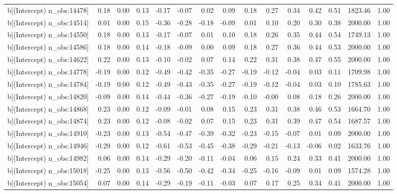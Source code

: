 \begin{table}[ht]
\begin{tabular}{rrrrrrrrrrrrrrr}
  b[(Intercept) n\_obs:14478] & 0.18 & 0.00 & 0.13 & -0.17 & -0.07 & 0.02 & 0.09 & 0.18 & 0.27 & 0.34 & 0.42 & 0.51 & 1823.46 & 1.00 \\ 
  b[(Intercept) n\_obs:14514] & 0.01 & 0.00 & 0.15 & -0.36 & -0.28 & -0.18 & -0.09 & 0.01 & 0.10 & 0.20 & 0.30 & 0.38 & 2000.00 & 1.00 \\ 
  b[(Intercept) n\_obs:14550] & 0.18 & 0.00 & 0.13 & -0.17 & -0.07 & 0.01 & 0.10 & 0.18 & 0.26 & 0.35 & 0.44 & 0.54 & 1749.13 & 1.00 \\ 
  b[(Intercept) n\_obs:14586] & 0.18 & 0.00 & 0.14 & -0.18 & -0.09 & 0.00 & 0.09 & 0.18 & 0.27 & 0.36 & 0.44 & 0.53 & 2000.00 & 1.00 \\ 
  b[(Intercept) n\_obs:14622] & 0.22 & 0.00 & 0.13 & -0.10 & -0.02 & 0.07 & 0.14 & 0.22 & 0.31 & 0.38 & 0.47 & 0.55 & 2000.00 & 1.00 \\ 
  b[(Intercept) n\_obs:14778] & -0.19 & 0.00 & 0.12 & -0.49 & -0.42 & -0.35 & -0.27 & -0.19 & -0.12 & -0.04 & 0.03 & 0.11 & 1709.98 & 1.00 \\ 
  b[(Intercept) n\_obs:14784] & -0.19 & 0.00 & 0.12 & -0.49 & -0.43 & -0.35 & -0.27 & -0.19 & -0.12 & -0.04 & 0.03 & 0.10 & 1785.63 & 1.00 \\ 
  b[(Intercept) n\_obs:14820] & -0.09 & 0.00 & 0.14 & -0.44 & -0.36 & -0.27 & -0.19 & -0.10 & -0.00 & 0.08 & 0.18 & 0.26 & 2000.00 & 1.00 \\ 
  b[(Intercept) n\_obs:14868] & 0.23 & 0.00 & 0.12 & -0.09 & -0.01 & 0.08 & 0.15 & 0.23 & 0.31 & 0.38 & 0.46 & 0.53 & 1664.70 & 1.00 \\ 
  b[(Intercept) n\_obs:14874] & 0.23 & 0.00 & 0.12 & -0.08 & -0.02 & 0.07 & 0.15 & 0.23 & 0.31 & 0.39 & 0.47 & 0.54 & 1687.57 & 1.00 \\ 
  b[(Intercept) n\_obs:14910] & -0.23 & 0.00 & 0.13 & -0.54 & -0.47 & -0.39 & -0.32 & -0.23 & -0.15 & -0.07 & 0.01 & 0.09 & 2000.00 & 1.00 \\ 
  b[(Intercept) n\_obs:14946] & -0.29 & 0.00 & 0.12 & -0.61 & -0.53 & -0.45 & -0.38 & -0.29 & -0.21 & -0.13 & -0.06 & 0.02 & 1633.76 & 1.00 \\ 
  b[(Intercept) n\_obs:14982] & 0.06 & 0.00 & 0.14 & -0.29 & -0.20 & -0.11 & -0.04 & 0.06 & 0.15 & 0.24 & 0.33 & 0.41 & 2000.00 & 1.00 \\ 
  b[(Intercept) n\_obs:15018] & -0.25 & 0.00 & 0.13 & -0.56 & -0.50 & -0.42 & -0.34 & -0.25 & -0.16 & -0.09 & 0.01 & 0.09 & 1574.28 & 1.00 \\ 
  b[(Intercept) n\_obs:15054] & 0.07 & 0.00 & 0.14 & -0.29 & -0.19 & -0.11 & -0.03 & 0.07 & 0.17 & 0.25 & 0.34 & 0.41 & 2000.00 & 1.00 \\ 

\end{tabular}
\end{table}
